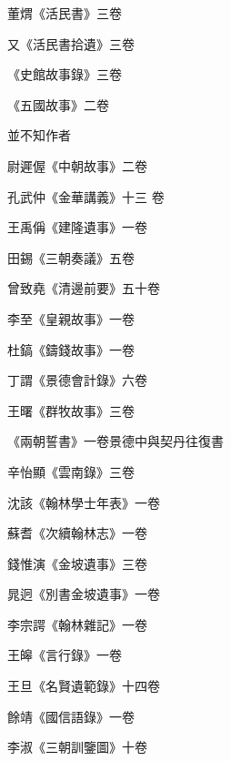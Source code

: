 \begin{pinyinscope}
 董煟《活民書》三卷



 又《活民書拾遺》三卷



 《史館故事錄》三卷



 《五國故事》二卷



 並不知作者



 尉遲偓《中朝故事》二卷



 孔武仲《金華講義》十三
 卷



 王禹偁《建隆遺事》一卷



 田錫《三朝奏議》五卷



 曾致堯《清邊前要》五十卷



 李至《皇親故事》一卷



 杜鎬《鑄錢故事》一卷



 丁謂《景德會計錄》六卷



 王曙《群牧故事》三卷



 《兩朝誓書》一卷景德中與契丹往復書



 辛怡顯《雲南錄》三卷



 沈該《翰林學士年表》一卷



 蘇耆《次續翰林志》一卷



 錢惟演《金坡遺事》三卷



 晁迥《別書金坡遺事》一卷



 李宗諤《翰林雜記》一卷



 王皞《言行錄》一卷



 王旦《名賢遺範錄》十四卷



 餘靖《國信語錄》一卷



 李淑《三朝訓鑒圖》十卷




\end{pinyinscope}
